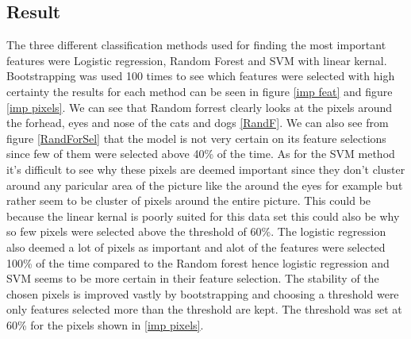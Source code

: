 \documentclass{article}
\begin{document}
\subsection{Result}
The three different classification methods used for finding the most important features were Logistic regression, Random Forest and SVM with linear kernal. Bootstrapping was used 100 times to see which features were selected with high certainty the results for each method can be seen in figure \ref{imp feat} and figure \ref{imp pixels}. We can see that Random forrest clearly looks at the pixels around the forhead, eyes and nose of the cats and dogs \ref{RandF}. We can also see from figure \ref{RandForSel} that the model is not very certain on its feature selections since few of them were selected above 40\% of the time. As for the SVM method it's difficult to see why these pixels are deemed important since they don't cluster around any paricular area of the picture like the around the eyes for example but rather seem to be cluster of pixels around the entire picture. This could be because the linear kernal is poorly suited for this data set this could also be why so few pixels were selected above the threshold of 60\%. The logistic regression also deemed a lot of pixels as important and alot of the features were selected 100\% of the time compared to the Random forest hence logistic regression and SVM seems to be more certain in their feature selection.  The stability of the chosen pixels is improved vastly by bootstrapping and choosing a threshold were only features selected more than the threshold are kept. The threshold was set at 60\% for the pixels shown in \ref{imp pixels}.
\end{document}
